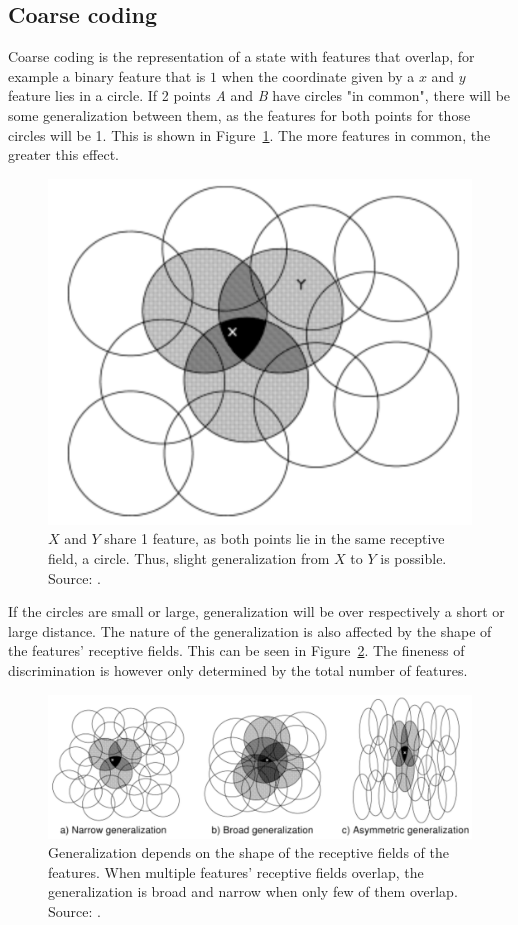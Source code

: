 \subsection{Coarse coding}
\label{subs:rl_cc}
Coarse coding is the representation of a state with features that overlap, for example a binary feature that is $1$ when the coordinate given by a $x$ and $y$ feature lies in a circle. If 2 points \textit{A} and \textit{B} have circles "in common", there will be some generalization between them, as the features for both points for those circles will be 1. This is shown in Figure~\ref{fig:coarsecoding1}. The more features in common, the greater this effect.
\begin{figure}[htb]
\captionsetup{width=0.8\textwidth}
\centering
\includegraphics[width=0.5\linewidth]{images/coarsecoding1.png}
\caption[Generalization between points]{$X$ and $Y$ share 1 feature, as both points lie in the same receptive field, a circle. Thus, slight generalization from $X$ to $Y$ is possible. Source: \cite{Sutton1998ReinforcementIntroduction}.}
\label{fig:coarsecoding1}
\end{figure}
If the circles are small or large, generalization will be over respectively a short or large distance. The nature of the generalization is also affected by the shape of the features' receptive fields.  This can be seen in Figure~\ref{fig:coarsecoding2}. The fineness of discrimination is however only determined by the total number of features.
\begin{figure}[htb]
\captionsetup{width=0.8\textwidth}
\centering
\includegraphics[width=0.8\linewidth]{images/coarsecoding2.png}
\caption[Shapes of receptive fields]{Generalization depends on the shape of the receptive fields of the features. When multiple features' receptive fields overlap, the generalization is broad and narrow when only few of them overlap. Source: \cite{Sutton1998ReinforcementIntroduction}.}
\label{fig:coarsecoding2}
\end{figure}

